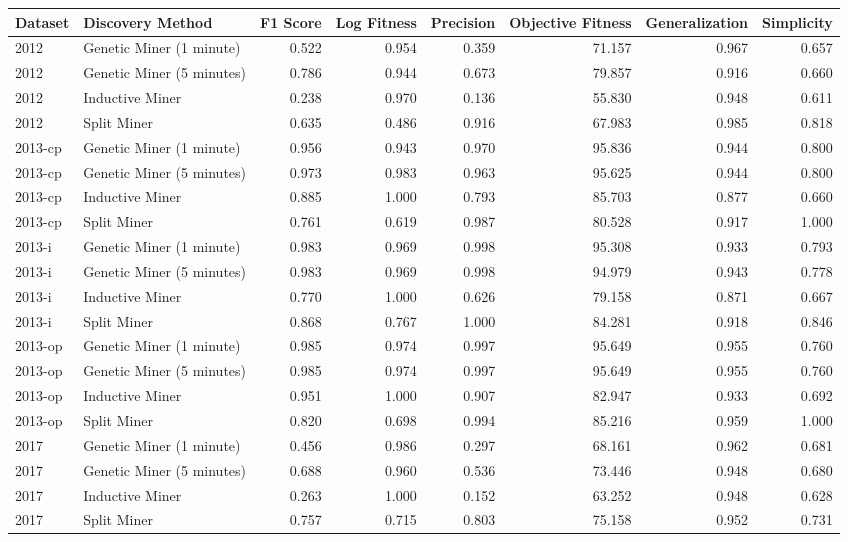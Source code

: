 \begin{tabular}{llrrrrrr}
\toprule
Dataset & Discovery Method & F1 Score & Log Fitness & Precision & Objective Fitness & Generalization & Simplicity \\
\midrule
2012 & Genetic Miner (1 minute) & 0.522 & 0.954 & 0.359 & 71.157 & 0.967 & 0.657 \\
2012 & Genetic Miner (5 minutes) & 0.786 & 0.944 & 0.673 & 79.857 & 0.916 & 0.660 \\
2012 & Inductive Miner & 0.238 & 0.970 & 0.136 & 55.830 & 0.948 & 0.611 \\
2012 & Split Miner & 0.635 & 0.486 & 0.916 & 67.983 & 0.985 & 0.818 \\
2013-cp & Genetic Miner (1 minute) & 0.956 & 0.943 & 0.970 & 95.836 & 0.944 & 0.800 \\
2013-cp & Genetic Miner (5 minutes) & 0.973 & 0.983 & 0.963 & 95.625 & 0.944 & 0.800 \\
2013-cp & Inductive Miner & 0.885 & 1.000 & 0.793 & 85.703 & 0.877 & 0.660 \\
2013-cp & Split Miner & 0.761 & 0.619 & 0.987 & 80.528 & 0.917 & 1.000 \\
2013-i & Genetic Miner (1 minute) & 0.983 & 0.969 & 0.998 & 95.308 & 0.933 & 0.793 \\
2013-i & Genetic Miner (5 minutes) & 0.983 & 0.969 & 0.998 & 94.979 & 0.943 & 0.778 \\
2013-i & Inductive Miner & 0.770 & 1.000 & 0.626 & 79.158 & 0.871 & 0.667 \\
2013-i & Split Miner & 0.868 & 0.767 & 1.000 & 84.281 & 0.918 & 0.846 \\
2013-op & Genetic Miner (1 minute) & 0.985 & 0.974 & 0.997 & 95.649 & 0.955 & 0.760 \\
2013-op & Genetic Miner (5 minutes) & 0.985 & 0.974 & 0.997 & 95.649 & 0.955 & 0.760 \\
2013-op & Inductive Miner & 0.951 & 1.000 & 0.907 & 82.947 & 0.933 & 0.692 \\
2013-op & Split Miner & 0.820 & 0.698 & 0.994 & 85.216 & 0.959 & 1.000 \\
2017 & Genetic Miner (1 minute) & 0.456 & 0.986 & 0.297 & 68.161 & 0.962 & 0.681 \\
2017 & Genetic Miner (5 minutes) & 0.688 & 0.960 & 0.536 & 73.446 & 0.948 & 0.680 \\
2017 & Inductive Miner & 0.263 & 1.000 & 0.152 & 63.252 & 0.948 & 0.628 \\
2017 & Split Miner & 0.757 & 0.715 & 0.803 & 75.158 & 0.952 & 0.731 \\

\end{tabular}
